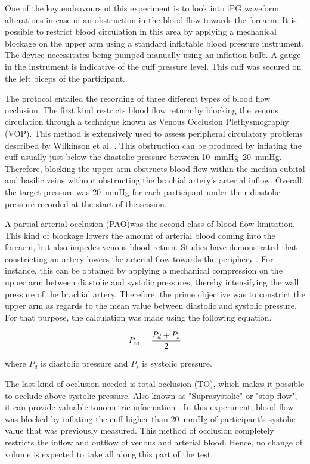 One of the key endeavours of this experiment is to look into iPG waveform alterations in case of an obstruction in the blood flow towards the forearm. It is possible to restrict  blood circulation in this area by applying a mechanical blockage on the upper arm using a standard inflatable blood pressure instrument. The device necessitates being pumped manually using an inflation bulb. A gauge in the instrument is indicative of the cuff pressure level. This cuff was secured on the left biceps of the participant. 

The protocol entailed the recording of three different types of blood flow occlusion. The first kind restricts blood flow return by blocking the venous circulation through a technique known as Venous Occlusion Plethysmography (VOP). This method is extensively used to assess peripheral circulatory problems  described by Wilkinson et al. \cite{wilkinson2001venous}. This obstruction can be produced by inflating the cuff usually just below the diastolic pressure between \SIrange{10}{20}{\mmHg}. Therefore, blocking the upper arm obstructs blood flow within the median cubital and basilic veins without obstructing the brachial artery's arterial inflow.  Overall, the target pressure was \SI{20}{\mmHg} for each participant under their diastolic pressure recorded at the start of the session.

A partial arterial occlusion (PAO)was the second class of blood flow limitation. This kind of blockage lowers the amount of arterial blood coming into the forearm, but also impedes venous blood return. Studies have demonstrated that constricting an artery lowers the arterial flow towards the periphery \cite{uchida1977cyclical}. For instance, this can be obtained by applying a mechanical compression on the upper arm between diastolic and systolic pressures, thereby intensifying the wall pressure of the brachial artery. Therefore, the prime objective was to constrict the upper arm as regards to the mean value between diastolic and systolic pressure. For that purpose, the calculation was made using the following equation.

\begin{align}
	\label{eq:meanpressure}
	P_m = \frac{P_d + P_s}{2} \tagaddtext{[\si{\mmHg}]}
\end{align}

where $P_d$ is diastolic pressure and $P_s$ is systolic pressure. 

The last kind of occlusion needed is total occlusion (TO), which makes it possible to occlude above systolic pressure. Also known as "Suprasystolic" or "stop-flow", it can provide valuable tonometric information \cite{lowe2009non}. In this experiment, blood flow was blocked by inflating the cuff higher than \SI{20}{\mmHg} of participant's systolic value that was previously measured. This method of occlusion completely restricts the inflow and outflow of venous and arterial blood. Hence, no change of volume is expected to take all along this part of the test.

